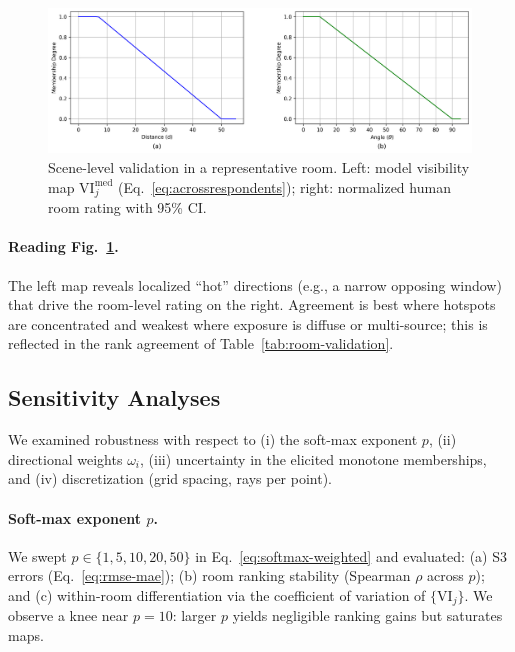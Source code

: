 \documentclass[final,3p,times,review]{elsarticle}
\begin{document}
\begin{figure}[H]
  \centering
  \includegraphics[width=.95\linewidth]{fuzzy_membership_functions.png}
  \caption{Scene-level validation in a representative room. Left: model visibility map $\mathrm{VI}_j^{\mathrm{med}}$ (Eq.~\eqref{eq:acrossrespondents}); right: normalized human room rating with 95\% CI.}
  \label{fig:vi-map-vs-rating}
\end{figure}


\paragraph{Reading Fig.~\ref{fig:vi-map-vs-rating}.}
The left map reveals localized “hot” directions (e.g., a narrow opposing window) that drive the room-level rating on the right. Agreement is best where hotspots are concentrated and weakest where exposure is diffuse or multi-source; this is reflected in the rank agreement of Table~\ref{tab:room-validation}.

\subsection{Sensitivity Analyses}
\label{sec:sensitivity}
We examined robustness with respect to (i) the soft-max exponent $p$, (ii) directional weights $\omega_i$, (iii) uncertainty in the elicited monotone memberships, and (iv) discretization (grid spacing, rays per point).

\paragraph{Soft-max exponent $p$.}
We swept $p\in\{1,5,10,20,50\}$ in Eq.~\eqref{eq:softmax-weighted} and evaluated: (a) S3 errors (Eq.~\eqref{eq:rmse-mae}); (b) room ranking stability (Spearman $\rho$ across $p$); and (c) within-room differentiation via the coefficient of variation of $\{\mathrm{VI}_j\}$. We observe a knee near $p{=}10$: larger $p$ yields negligible ranking gains but saturates maps.
\end{document}
